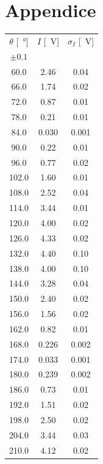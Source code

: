 \documentclass[10pt,oneside,a4paper]{article}
\begin{document}
\newpage
\section{Appendice}

\begin{minipage}[t]{.5\linewidth}
\begin{center}
\label{tab:taratura_lambda2}
\begin{tabular}{c|c|c}
\toprule
     $\theta$ [\SI{}{\degree}] &    $I$ [\SI{}{V}] &   $\sigma_I$ [\SI{}{V}]\\
     $\pm 0.1$ & & \\
\midrule
  60.0 &  2.46 &  0.04 \\
  66.0 &  1.74 &  0.02 \\
  72.0 &  0.87 &  0.01 \\
  78.0 &  0.21 &  0.01 \\
  84.0 &  0.030 &  0.001 \\
  90.0 &  0.22 &  0.01 \\
  96.0 &  0.77 &  0.02 \\
 102.0 &  1.60 &  0.01 \\
 108.0 &  2.52 &  0.04 \\
 114.0 &  3.44 &  0.01 \\
 120.0 &  4.00 &  0.02 \\
 126.0 &  4.33 &  0.02 \\
 132.0 &  4.40 &  0.10 \\
 138.0 &  4.00 &  0.10 \\
 144.0 &  3.28 &  0.04 \\
 150.0 &  2.40 &  0.02 \\
 156.0 &  1.56 &  0.02 \\
 162.0 &  0.82 &  0.01 \\
 168.0 &  0.226 &  0.002 \\
 174.0 &  0.033 &  0.001 \\
 180.0 &  0.239 &  0.002 \\
 186.0 &  0.73 &  0.01 \\
 192.0 &  1.51 &  0.02 \\
 198.0 &  2.50 &  0.02 \\
 204.0 &  3.44 &  0.03 \\
 210.0 &  4.12 &  0.02 \\
\bottomrule
\end{tabular}
\end{center}
\end{minipage}
\end{document}
